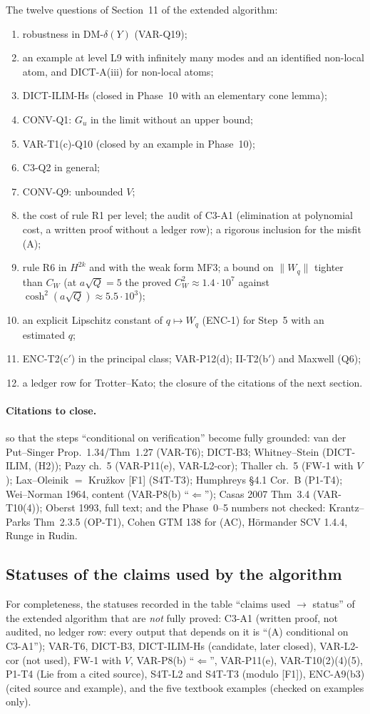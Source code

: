 The twelve questions of Section~11 of the extended algorithm:
\begin{enumerate}
\item robustness in DM-$\delta(Y)$ (VAR-Q19);
\item an example at level L9 with infinitely many modes and an identified non-local atom, and DICT-A(iii) for non-local atoms;
\item DICT-ILIM-Hs (closed in Phase~10 with an elementary cone lemma);
\item CONV-Q1: $G_u$ in the limit without an upper bound;
\item VAR-T1(c)-Q10 (closed by an example in Phase~10);
\item C3-Q2 in general;
\item CONV-Q9: unbounded $V$;
\item the cost of rule R1 per level; the audit of C3-A1 (elimination at polynomial cost, a written proof without a ledger row); a rigorous inclusion for the misfit (A);
\item rule R6 in $H^{2k}$ and with the weak form MF3; a bound on $\|W_q\|$ tighter than $C_W$ (at $a\sqrt Q=5$ the proved $C_W^2\approx1.4\cdot10^7$ against $\cosh^2(a\sqrt Q)\approx5.5\cdot10^3$);
\item an explicit Lipschitz constant of $q\mapsto W_q$ (ENC-1) for Step~5 with an estimated $q$;
\item ENC-T2(c$'$) in the principal class; VAR-P12(d); II-T2(b$'$) and Maxwell (Q6);
\item a ledger row for Trotter--Kato; the closure of the citations of the next section.
\end{enumerate}

\paragraph{Citations to close.} so that the steps ``conditional on verification'' become fully grounded: van der Put--Singer Prop.~1.34/Thm~1.27 (VAR-T6); DICT-B3; Whitney--Stein (DICT-ILIM, (H2)); Pazy ch.~5 (VAR-P11(e), VAR-L2-cor); Thaller ch.~5 (FW-1 with $V$); Lax--Oleinik $=$ Kru\v zkov [F1] (S4T-T3); Humphreys \S4.1 Cor.~B (P1-T4); Wei--Norman 1964, content (VAR-P8(b) ``$\Leftarrow$''); Casas 2007 Thm~3.4 (VAR-T10(4)); Oberst 1993, full text; and the Phase~0--5 numbers not checked: Krantz--Parks Thm~2.3.5 (OP-T1), Cohen GTM 138 for (AC), H\"ormander SCV 1.4.4, Runge in Rudin.

\subsection{Statuses of the claims used by the algorithm}

For completeness, the statuses recorded in the table ``claims used $\to$ status'' of the extended algorithm that are \emph{not} fully proved: C3-A1 (written proof, not audited, no ledger row: every output that depends on it is ``(A) conditional on C3-A1''); VAR-T6, DICT-B3, DICT-ILIM-Hs (candidate, later closed), VAR-L2-cor (not used), FW-1 with $V$, VAR-P8(b) ``$\Leftarrow$'', VAR-P11(e), VAR-T10(2)(4)(5), P1-T4 (Lie from a cited source), S4T-L2 and S4T-T3 (modulo [F1]), ENC-A9(b3) (cited source and example), and the five textbook examples (checked on examples only).
